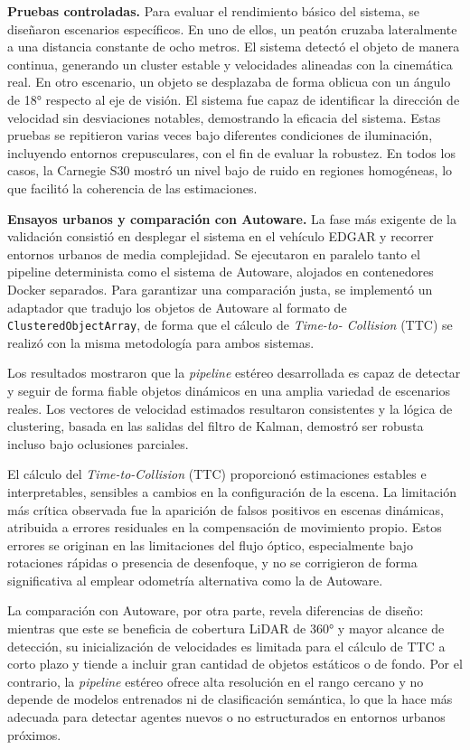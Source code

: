 \bigskip
\noindent \textbf{Pruebas controladas.}  
Para evaluar el rendimiento básico del sistema, se diseñaron escenarios
específicos. En uno de ellos, un peatón cruzaba lateralmente a una distancia
constante de ocho metros. El sistema detectó el objeto de manera continua,
generando un cluster estable y velocidades alineadas con la cinemática real. En
otro escenario, un objeto se desplazaba de forma oblicua con un ángulo de 18°
respecto al eje de visión. El sistema fue capaz de identificar la dirección de
velocidad sin desviaciones notables, demostrando la eficacia del sistema. Estas pruebas se repitieron varias veces bajo diferentes
condiciones de iluminación, incluyendo entornos crepusculares, con el fin de
evaluar la robustez. En todos los casos, la Carnegie S30 mostró un nivel bajo
de ruido en regiones homogéneas, lo que facilitó la coherencia de las
estimaciones.

\bigskip
\noindent \textbf{Ensayos urbanos y comparación con Autoware.}  
La fase más exigente de la validación consistió en desplegar el sistema en el
vehículo EDGAR y recorrer entornos urbanos de media complejidad. Se ejecutaron
en paralelo tanto el pipeline determinista como el sistema de Autoware, alojados en
contenedores Docker separados. Para garantizar una comparación justa, se
implementó un adaptador que tradujo los objetos de Autoware al formato de
\texttt{ClusteredObjectArray}, de forma que el cálculo de \textit{Time-to-
Collision} (TTC) se realizó con la misma metodología para ambos sistemas.

Los resultados mostraron que la \textit{pipeline} estéreo desarrollada es capaz
de detectar y seguir de forma fiable objetos dinámicos en una amplia variedad de
escenarios reales. Los vectores de velocidad estimados resultaron consistentes y
la lógica de clustering, basada en las salidas del filtro de Kalman, demostró
ser robusta incluso bajo oclusiones parciales. 

El cálculo del \textit{Time-to-Collision} (TTC) proporcionó estimaciones
estables e interpretables, sensibles a cambios en la configuración de la
escena. La limitación más crítica observada fue la aparición de falsos
positivos en escenas dinámicas, atribuida a errores residuales en la
compensación de movimiento propio. Estos errores se originan en las limitaciones del
flujo óptico, especialmente bajo rotaciones rápidas o presencia de desenfoque,
y no se corrigieron de forma significativa al emplear odometría alternativa
como la de Autoware.

La comparación con Autoware, por otra parte, revela diferencias de diseño:
mientras que este se beneficia de cobertura LiDAR de 360° y mayor alcance de
detección, su inicialización de velocidades es limitada para el cálculo de TTC
a corto plazo y tiende a incluir gran cantidad de objetos estáticos o de fondo.
Por el contrario, la \textit{pipeline} estéreo ofrece alta resolución en el
rango cercano y no depende de modelos entrenados ni de clasificación semántica,
lo que la hace más adecuada para detectar agentes nuevos o no estructurados en
entornos urbanos próximos.

